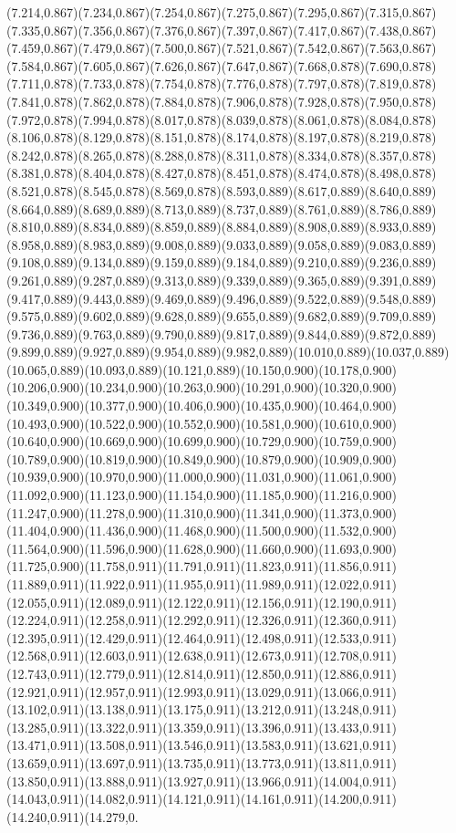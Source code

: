 \documentclass[smallextended]{svjour3}
\begin{document}
(7.214,0.867)(7.234,0.867)(7.254,0.867)(7.275,0.867)(7.295,0.867)(7.315,0.867)(7.335,0.867)(7.356,0.867)(7.376,0.867)(7.397,0.867)(7.417,0.867)(7.438,0.867)(7.459,0.867)(7.479,0.867)(7.500,0.867)(7.521,0.867)(7.542,0.867)(7.563,0.867)(7.584,0.867)(7.605,0.867)(7.626,0.867)(7.647,0.867)(7.668,0.878)(7.690,0.878)(7.711,0.878)(7.733,0.878)(7.754,0.878)(7.776,0.878)(7.797,0.878)(7.819,0.878)(7.841,0.878)(7.862,0.878)(7.884,0.878)(7.906,0.878)(7.928,0.878)(7.950,0.878)(7.972,0.878)(7.994,0.878)(8.017,0.878)(8.039,0.878)(8.061,0.878)(8.084,0.878)(8.106,0.878)(8.129,0.878)(8.151,0.878)(8.174,0.878)(8.197,0.878)(8.219,0.878)(8.242,0.878)(8.265,0.878)(8.288,0.878)(8.311,0.878)(8.334,0.878)(8.357,0.878)(8.381,0.878)(8.404,0.878)(8.427,0.878)(8.451,0.878)(8.474,0.878)(8.498,0.878)(8.521,0.878)(8.545,0.878)(8.569,0.878)(8.593,0.889)(8.617,0.889)(8.640,0.889)(8.664,0.889)(8.689,0.889)(8.713,0.889)(8.737,0.889)(8.761,0.889)(8.786,0.889)(8.810,0.889)(8.834,0.889)(8.859,0.889)(8.884,0.889)(8.908,0.889)(8.933,0.889)(8.958,0.889)(8.983,0.889)(9.008,0.889)(9.033,0.889)(9.058,0.889)(9.083,0.889)(9.108,0.889)(9.134,0.889)(9.159,0.889)(9.184,0.889)(9.210,0.889)(9.236,0.889)(9.261,0.889)(9.287,0.889)(9.313,0.889)(9.339,0.889)(9.365,0.889)(9.391,0.889)(9.417,0.889)(9.443,0.889)(9.469,0.889)(9.496,0.889)(9.522,0.889)(9.548,0.889)(9.575,0.889)(9.602,0.889)(9.628,0.889)(9.655,0.889)(9.682,0.889)(9.709,0.889)(9.736,0.889)(9.763,0.889)(9.790,0.889)(9.817,0.889)(9.844,0.889)(9.872,0.889)(9.899,0.889)(9.927,0.889)(9.954,0.889)(9.982,0.889)(10.010,0.889)(10.037,0.889)(10.065,0.889)(10.093,0.889)(10.121,0.889)(10.150,0.900)(10.178,0.900)(10.206,0.900)(10.234,0.900)(10.263,0.900)(10.291,0.900)(10.320,0.900)(10.349,0.900)(10.377,0.900)(10.406,0.900)(10.435,0.900)(10.464,0.900)(10.493,0.900)(10.522,0.900)(10.552,0.900)(10.581,0.900)(10.610,0.900)(10.640,0.900)(10.669,0.900)(10.699,0.900)(10.729,0.900)(10.759,0.900)(10.789,0.900)(10.819,0.900)(10.849,0.900)(10.879,0.900)(10.909,0.900)(10.939,0.900)(10.970,0.900)(11.000,0.900)(11.031,0.900)(11.061,0.900)(11.092,0.900)(11.123,0.900)(11.154,0.900)(11.185,0.900)(11.216,0.900)(11.247,0.900)(11.278,0.900)(11.310,0.900)(11.341,0.900)(11.373,0.900)(11.404,0.900)(11.436,0.900)(11.468,0.900)(11.500,0.900)(11.532,0.900)(11.564,0.900)(11.596,0.900)(11.628,0.900)(11.660,0.900)(11.693,0.900)(11.725,0.900)(11.758,0.911)(11.791,0.911)(11.823,0.911)(11.856,0.911)(11.889,0.911)(11.922,0.911)(11.955,0.911)(11.989,0.911)(12.022,0.911)(12.055,0.911)(12.089,0.911)(12.122,0.911)(12.156,0.911)(12.190,0.911)(12.224,0.911)(12.258,0.911)(12.292,0.911)(12.326,0.911)(12.360,0.911)(12.395,0.911)(12.429,0.911)(12.464,0.911)(12.498,0.911)(12.533,0.911)(12.568,0.911)(12.603,0.911)(12.638,0.911)(12.673,0.911)(12.708,0.911)(12.743,0.911)(12.779,0.911)(12.814,0.911)(12.850,0.911)(12.886,0.911)(12.921,0.911)(12.957,0.911)(12.993,0.911)(13.029,0.911)(13.066,0.911)(13.102,0.911)(13.138,0.911)(13.175,0.911)(13.212,0.911)(13.248,0.911)(13.285,0.911)(13.322,0.911)(13.359,0.911)(13.396,0.911)(13.433,0.911)(13.471,0.911)(13.508,0.911)(13.546,0.911)(13.583,0.911)(13.621,0.911)(13.659,0.911)(13.697,0.911)(13.735,0.911)(13.773,0.911)(13.811,0.911)(13.850,0.911)(13.888,0.911)(13.927,0.911)(13.966,0.911)(14.004,0.911)(14.043,0.911)(14.082,0.911)(14.121,0.911)(14.161,0.911)(14.200,0.911)(14.240,0.911)(14.279,0.
\end{document}
